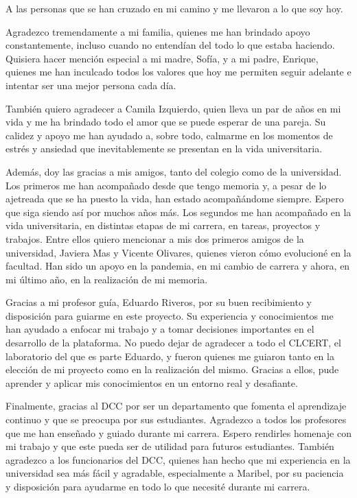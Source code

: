 \documentclass{umemoria}
\begin{document}

\begin{dedicatoria}
A las personas que se han cruzado en mi camino y me llevaron a lo que soy hoy.
\end{dedicatoria}

\begin{thanks}
    Agradezco tremendamente a mi familia, quienes me han brindado apoyo constantemente,
    incluso cuando no entendían del todo lo que estaba haciendo. Quisiera hacer mención especial
    a mi madre, Sofía, y a mi padre, Enrique, quienes me han inculcado todos los valores que hoy me permiten
    seguir adelante e intentar ser una mejor persona cada día.

    También quiero agradecer a Camila Izquierdo, quien lleva un par de años en mi vida y me ha brindado todo
    el amor que se puede esperar de una pareja. Su calidez y apoyo me han ayudado a, sobre todo, calmarme en los
    momentos de estrés y ansiedad que inevitablemente se presentan en la vida universitaria. 

    Además, doy las gracias a mis amigos, tanto del colegio como de la universidad. Los primeros me han
    acompañado desde que tengo memoria y, a pesar de lo ajetreada que se ha puesto la vida, han estado 
    acompañándome siempre. Espero que siga siendo así por muchos años más. Los segundos me han acompañado
    en la vida universitaria, en distintas etapas de mi carrera, en tareas, proyectos y trabajos. Entre ellos
    quiero mencionar a mis dos primeros amigos de la universidad, Javiera Mas y Vicente Olivares, quienes 
    vieron cómo evolucioné en la facultad. Han sido un apoyo en la pandemia, en mi cambio de carrera y ahora, en 
    mi último año, en la realización de mi memoria.

    Gracias a mi profesor guía, Eduardo Riveros, por su buen recibimiento y disposición para guiarme en este proyecto. 
    Su experiencia y conocimientos me han ayudado a enfocar mi trabajo y a tomar decisiones importantes en el desarrollo de la plataforma.
    No puedo dejar de agradecer a todo el CLCERT, el laboratorio del que es parte Eduardo, y fueron quienes me guiaron tanto en
    la elección de mi proyecto como en la realización del mismo. Gracias a ellos, pude aprender y aplicar mis conocimientos en un entorno real y desafiante.

    Finalmente, gracias al DCC por ser un departamento que fomenta el aprendizaje continuo y que se preocupa por sus estudiantes. Agradezco a todos los profesores 
    que me han enseñado y guiado durante mi carrera. Espero rendirles homenaje con mi trabajo y que este pueda ser de utilidad para futuros estudiantes. 
    También agradezco a los funcionarios del DCC, quienes han hecho que mi experiencia en la universidad sea más fácil y agradable, especialmente a Maribel, 
    por su paciencia y disposición para  ayudarme en todo lo que necesité durante mi carrera.
\end{thanks}
\end{document}
